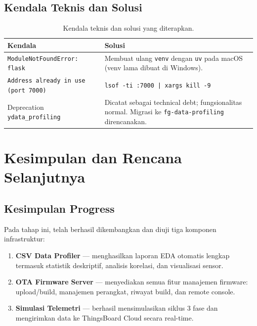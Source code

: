 \documentclass[12pt,a4paper]{report}
\begin{document}
\section{Kendala Teknis dan Solusi}

\begin{table}[H]
  \centering
  \caption{Kendala teknis dan solusi yang diterapkan.}
  \label{tab:kendala}
  \begin{tabular}{p{}p{}}
    \toprule
    \textbf{Kendala} & \textbf{Solusi} \\
    \midrule
    \texttt{ModuleNotFoundError: flask} &
    Membuat ulang \texttt{venv} dengan \texttt{uv} pada macOS
    (venv lama dibuat di Windows). \\[6pt]
    \texttt{Address already in use (port 7000)} &
    \texttt{lsof -ti :7000 | xargs kill -9} \\[6pt]
    Deprecation \texttt{ydata\_profiling} &
    Dicatat sebagai technical debt; fungsionalitas normal.
    Migrasi ke \texttt{fg-data-profiling} direncanakan. \\
    \bottomrule
  \end{tabular}
\end{table}

\chapter{Kesimpulan dan Rencana Selanjutnya}

\section{Kesimpulan Progress}

Pada tahap ini, telah berhasil dikembangkan dan diuji tiga komponen infrastruktur:

\begin{enumerate}[leftmargin=2cm, itemsep=4pt]
  \item \textbf{CSV Data Profiler} --- menghasilkan laporan EDA otomatis lengkap
        termasuk statistik deskriptif, analisis korelasi, dan visualisasi sensor.

  \item \textbf{OTA Firmware Server} --- menyediakan semua fitur manajemen
        firmware: upload/build, manajemen perangkat, riwayat build, dan remote console.

  \item \textbf{Simulasi Telemetri} --- berhasil mensimulasikan siklus 3 fase dan
        mengirimkan data ke ThingsBoard Cloud secara real-time.
\end{enumerate}
\end{document}
